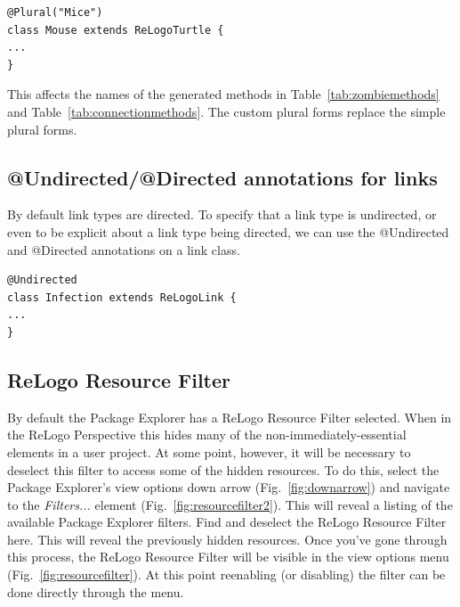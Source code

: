 \documentclass[11pt]{amsart}
\begin{document}
\noindent\begin{minipage}[h]{\textwidth}
\vspace{.2in}
\lstset{language=java, numbers=none}
\begin{lstlisting}
@Plural("Mice")
class Mouse extends ReLogoTurtle {
...
}
\end{lstlisting}
\vspace{.2in}
\end{minipage}
This affects the names of the generated methods in Table~\ref{tab:zombiemethods} and Table~\ref{tab:connectionmethods}. The custom plural forms replace the simple plural forms.


\subsection{@Undirected/@Directed annotations for links}
By default link types are directed. To specify that a link type is undirected, or even to be explicit about a link type being directed, we can use the @Undirected and @Directed annotations on a link class.

\noindent\begin{minipage}[h]{\textwidth}
\vspace{.2in}
\lstset{language=java, numbers=none}
\begin{lstlisting}
@Undirected
class Infection extends ReLogoLink {
...
}
\end{lstlisting}
\vspace{.2in}
\end{minipage}

\subsection{ReLogo Resource Filter}
\label{sec:RRF}
By default the Package Explorer has a ReLogo Resource Filter selected. When in the ReLogo Perspective this hides many of the non-immediately-essential elements in a user project. At some point, however, it will be necessary to deselect this filter to access some of the hidden resources. To do this, select the Package Explorer's view options down arrow (Fig.~\ref{fig:downarrow}) and navigate to the \emph{Filters...} element (Fig.~\ref{fig:resourcefilter2}). This will reveal a listing of the available Package Explorer filters. Find and deselect the ReLogo Resource Filter here. This will reveal the previously hidden resources. Once you've gone through this process, the ReLogo Resource Filter will be visible in the view options menu (Fig.~\ref{fig:resourcefilter}). At this point reenabling (or disabling) the filter can be done directly through the menu.
\end{document}

